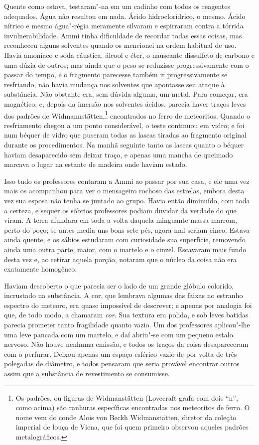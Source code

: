 Quente como estava, testaram"-na em um cadinho com todos os reagentes
adequados. Água não resultou em nada. Ácido hidroclorídrico, o mesmo.
Ácido nítrico e mesmo água"-régia meramente silvaram e espirraram contra
a tórrida invulnerabilidade. Ammi tinha dificuldade de recordar todas
essas coisas, mas reconheceu alguns solventes quando os mencionei na
ordem habitual de uso. Havia amoníaco e soda cáustica, álcool e éter, o
nauseante dissulfeto de carbono e uma dúzia de outros; mas ainda que o
peso se reduzisse progressivamente com o passar do tempo, e o fragmento
parecesse também ir progressivamente se resfriando, não havia mudança
nos solventes que apontasse seu ataque à substância. Não obstante era,
sem dúvida alguma, um metal. Para começar, era magnético; e, depois da
imersão nos solventes ácidos, parecia haver traços leves dos padrões de
Widmannstätten,\footnote{Os padrões, ou figuras de Widmanstätten
  (Lovecraft grafa com dois ``n'', como acima) são ranhuras específicas
  encontradas nos meteoritos de ferro. O nome vem do conde Alois von
  Beckh Widmanstätten, diretor da coleção imperial de louça de Viena,
  que foi quem primeiro observou aqueles padrões metalográficos.}
encontrados no ferro de meteoritos. Quando o resfriamento chegou a um
ponto considerável, o teste continuou em vidro; e foi num béquer de
vidro que puseram todas as lascas tiradas ao fragmento original durante
os procedimentos. Na manhã seguinte tanto as lascas quanto o béquer
haviam desaparecido sem deixar traço, e apenas uma mancha de queimado
marcava o lugar na estante de madeira onde haviam estado.

Isso tudo os professores contaram a Ammi ao passar por sua casa, e ele
uma vez mais os acompanhou para ver o mensageiro rochoso das estrelas,
embora desta vez sua esposa não tenha se juntado ao grupo. Havia então
diminuído, com toda a certeza, e sequer os sóbrios professores podiam
duvidar da verdade do que viram. A terra afundara em toda a volta
daquela minguante massa marrom, perto do poço; se antes media uns bons
sete pés, agora mal seriam cinco. Estava ainda quente, e os sábios
estudaram com curiosidade sua superfície, removendo ainda uma outra
parte, maior, com o martelo e o cinzel. Escavaram mais fundo desta vez
e, ao retirar aquela porção, notaram que o núcleo da coisa não era
exatamente homogêneo.

Haviam descoberto o que parecia ser o lado de um grande glóbulo
colorido, incrustado na substância. A cor, que lembrava algumas das
faixas no estranho espectro do meteoro, era quase impossível de
descrever; e apenas por analogia foi que, de todo modo, a chamaram
\emph{cor}. Sua textura era polida, e sob leves batidas parecia prometer
tanto fragilidade quanto vazio. Um dos professores aplicou"-lhe uma leve
pancada com um martelo, e daí abriu"-se com um pequeno estalo nervoso.
Não houve nenhuma emissão, e todos os traços da coisa desapareceram com
o perfurar. Deixou apenas um espaço esférico vazio de por volta de três
polegadas de diâmetro, e todos pensaram que seria provável encontrar
outros assim que a substância de revestimento se consumisse.

